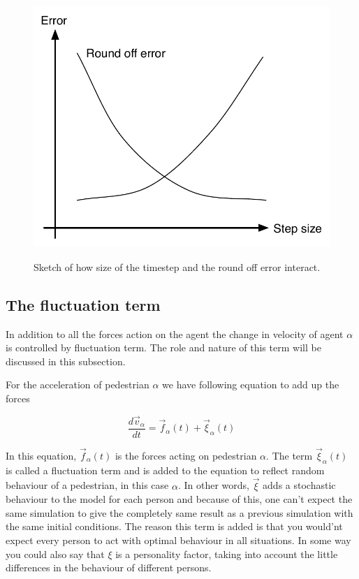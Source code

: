 \begin{figure}
    \centering
    {\includegraphics[scale=0.45]{Figures/timestepfigure.pdf}} 
    \caption{Sketch of how size of the timestep and the round off error interact.}
    \label{timestepfigure}
\end{figure}

\subsection{The fluctuation term}
In addition to all the forces action on the agent the change in velocity of agent 
$\alpha$ is controlled by fluctuation term. The role and nature of this term will 
be discussed in this subsection.

For the acceleration of pedestrian $\alpha$ we have following equation to add up the forces

\begin{equation}
\frac{d\vec{v}_{\alpha}}{dt}=\vec{f}_{\alpha}(t)+\vec{\xi}_{\alpha}(t)
\end{equation}

In this equation, $\vec{f}_{\alpha}(t)$ is the forces acting on pedestrian $\alpha$. 
The term $\vec{\xi}_{\alpha}(t)$ is called a fluctuation term and is added to the equation 
to reflect random behaviour of a pedestrian, in this case $\alpha$. In other words, $\vec{\xi}$ 
adds a stochastic behaviour to the model for each person and because of this, one can't expect 
the same simulation to give the completely same result as a previous simulation with the same 
initial conditions. The reason this term is added is that you would'nt expect every person to 
act with optimal behaviour in all situations. In some way you could also say that $\xi$ is a 
personality factor, taking into account the little differences in the behaviour of different 
persons.

